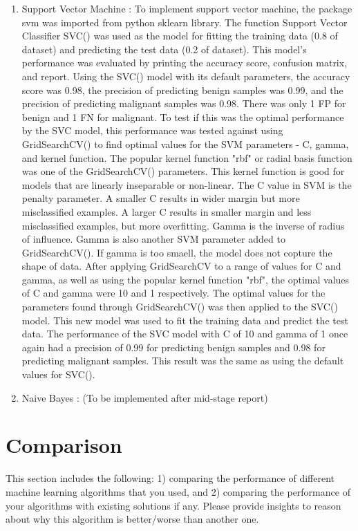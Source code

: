\documentclass[conference]{IEEEtran}
\begin{document}
\begin{enumerate}
    \item Support Vector Machine : To implement support vector machine, the package svm was imported from python sklearn library. The function Support Vector Classifier SVC() was used as the model for fitting the training data (0.8 of dataset) and predicting the test data (0.2 of dataset). This model's performance was evaluated by printing the accuracy score, confusion matrix, and report. Using the SVC() model with its default parameters, the accuracy score was 0.98, the precision of predicting benign samples was 0.99, and the precision of predicting malignant samples was 0.98. There was only 1 FP for benign and 1 FN for malignant. 
	To test if this was the optimal performance by the SVC model, this performance was tested against using GridSearchCV() to find optimal values for the SVM parameters - C, gamma, and kernel function. The popular kernel function "rbf" or radial basis function was one of the GridSearchCV() parameters. This kernel function is good for models that are linearly inseparable or non-linear. The C value in SVM is the penalty parameter. A smaller C results in wider margin but more misclassified examples. A larger C results in smaller margin and less misclassified examples, but more overfitting. Gamma is the inverse of radius of influence. Gamma is also another SVM parameter added to GridSearchCV(). If gamma is too smaell, the model does not copture the shape of data. After applying GridSearchCV to a range of values for C and gamma, as well as using the popular kernel function "rbf", the optimal values of C and gamma were 10 and 1 respectively. 
	The optimal values for the parameters found through GridSearchCV() was then applied to the SVC() model. This new model was used to fit the training data and predict the test data. The performance of the SVC model with C of 10 and gamma of 1 once again had a precision of 0.99 for predicting benign samples and 0.98 for predicting malignant samples. This result was the same as using the default values for SVC(). 

    \item Naive Bayes : (To be implemented after mid-stage report)
\end{enumerate}

\section{Comparison}  
This section includes the following: 1) comparing the performance of different machine learning algorithms that you used, and 2) comparing the performance of your algorithms with existing solutions if any. Please provide insights to reason about why this algorithm is better/worse than another one.
\end{document}
